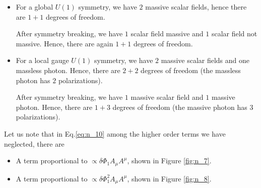\documentclass[../../Main/Main.tex]{subfiles}
\begin{document}
\begin{itemize}
\item For a global \( U(1) \)  symmetry, we have \( 2 \) massive scalar fields, hence there are \( 1+1 \) degrees of freedom.

After symmetry breaking, we have \( 1 \)  scalar field massive and \( 1 \) scalar field not massive. Hence, there are again \( 1+1 \) degrees of freedom.

\item For a local gauge \( U(1) \) symmetry, we have \( 2 \) massive scalar fields and one massless photon. Hence, there are \( 2 + 2 \) degrees of freedom (the massless photon has \( 2 \) polarizations).

After symmetry breaking, we have \( 1 \) massive scalar field  and \( 1 \) massive photon. Hence, there are  \( 1+3 \) degrees of freedom (the massive photon has \( 3 \) polarizations).

\end{itemize}



\begin{remark}
  Let us note that in Eq.\eqref{eq:n_10} among the higher order terms we have neglected, there are
\begin{itemize}
\item A term proportional to \( \propto \delta \Phi _1 A_ \mu A ^ \mu  \), shown in Figure \ref{fig:n_7}.
\item A term proportional to \( \propto \delta \Phi _1 ^2 A _ \mu A ^ \mu  \), shown in Figure \ref{fig:n_8}.
\end{itemize}
\end{remark}
\end{document}
